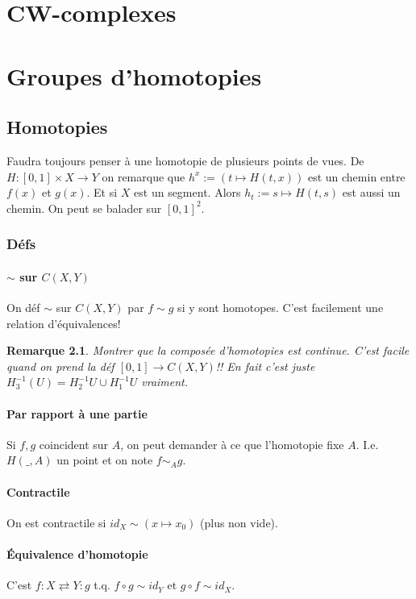 \documentclass[a4paper,12pt]{book}
\theoremstyle{plain}
\newtheorem{rem}{Remarque}
\theoremstyle{definition}
\theoremstyle{remark}
\begin{document}
\chapter{CW-complexes}

\chapter{Groupes d'homotopies}
\section{Homotopies}
Faudra toujours penser à une homotopie de plusieurs points de vues.
De $H\colon [0,1]\times X\to Y$ on remarque que 
$h^x:=(t\mapsto H(t,x))$ est un chemin entre $f(x)$ et $g(x)$. Et
si $X$ est un segment. Alors $h_t:=s\mapsto H(t,s)$ est aussi
un chemin. On peut se balader sur $[0,1]^2$.
\subsection{Défs}
\subsubsection{$\sim$ sur $C(X,Y)$}
On déf $\sim$ sur $C(X,Y)$ par
$f\sim g$ si y sont homotopes. C'est facilement
une relation d'équivalences!
\begin{rem}
  Montrer que la composée d'homotopies est
  continue. C'est facile quand on prend la déf
  $[0,1]\to C(X,Y)$!! En fait c'est juste 
  $H_3^{-1}(U)=H_2^{-1}U\cup H_1^{-1}U$ vraiment.
\end{rem}
\subsubsection{Par rapport à une partie}
Si $f,g$ coincident sur $A$, on peut demander à
ce que l'homotopie fixe $A$. I.e. $H(\_,A)$ un point et on note
$f\sim_A g$.
\subsubsection{Contractile}
On est contractile si $id_X\sim (x\mapsto x_0)$ (plus non vide).

\subsubsection{Équivalence d'homotopie}
C'est $f\colon X\rightleftarrows Y\colon g$ t.q. 
$f\circ g\sim id_Y$ et $g\circ f\sim id_X$.
\end{document}
